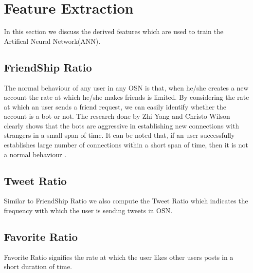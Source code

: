 \documentclass[conference]{IEEEtran}
\begin{document}
\section{Feature Extraction}
\label{featureDescription}
In this section we discuss the derived features which are used to train the Artifical Neural Network(ANN).

\subsection{FriendShip Ratio}
The normal behaviour of any user in any OSN is that, when he/she creates a new account the rate at which he/she makes friends is limited. 
By considering the rate at which an user sends a friend request, we can easily identify whether the account is a bot or not. 
The research done by Zhi Yang and Christo Wilson clearly shows that the bots are aggressive in establishing new connections 
with strangers in a small span of time. It can be noted that, if an user successfully establishes large 
number of connections within a short span of time, then it is not a normal behaviour \cite{11}.



\subsection{Tweet Ratio}
Similar to FriendShip Ratio we also compute the Tweet Ratio which indicates the frequency with which the user is sending tweets in OSN.
	


\subsection{Favorite Ratio}
Favorite Ratio signifies the rate at which the user likes other users posts in a short duration of time. 
\end{document}
